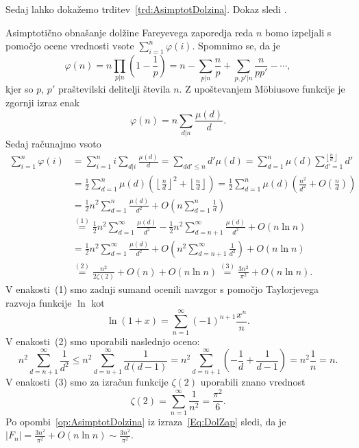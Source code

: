 \documentclass[mat1]{fmfdelo}
\begin{document}
%
Sedaj lahko dokažemo trditev~\ref{trd:AsimptotDolzina}. Dokaz sledi \cite[poglavje 18.5, str.~268]{hardy}.

\begin{dokaz}
Asimptotično obnašanje dolžine Fareyevega zaporedja reda $n$ bomo izpeljali s pomočjo ocene vrednosti vsote \( \sum_{i=1}^n \varphi(i) \).
Spomnimo se, da je 
\[ \varphi(n) = n \prod_{p|n} \left (1 - \frac{1}{p} \right ) = n - \sum_{p|n} \frac{n}{p} + \sum_{p,p'|n} \frac{n}{pp'} - \cdots , \]
kjer so $p$, $p'$ praštevilski delitelji števila $n$.  Z upoštevanjem M\"obiusove funkcije je zgornji izraz enak
\[ \varphi(n) = n \sum_{d|n} \frac{\mu(d)}{d} .\]
Sedaj računajmo vsoto 
%
\begin{align}
\label{Eq:DolZap}
\sum_{i=1}^n \varphi(i)
  &= \sum_{i=1}^n i \sum_{d|i} \frac{\mu(d)}{d} = \sum_{dd'\leq n}d' \mu(d) = 
    \sum_{d=1}^n \mu(d) \sum_{d'=1}^{\left \lfloor \frac{n}{d} \right \rfloor} d' \nonumber \\
  &= \frac{1}{2} \sum_{d=1}^{n} \mu(d) \left (\left \lfloor \frac{n}{d} \right \rfloor ^2 + \left \lfloor \frac{n}{d} \right \rfloor \right) =
    \frac{1}{2} \sum_{d=1}^{n} \mu(d) \left (\frac{n^2}{d^2} + O \left (\frac{n}{d} \right) \right) \nonumber \\
  &= \frac{1}{2}n^2 \sum_{d=1}^{n} \frac{\mu(d)}{d^2} + O \left (n \sum_{d=1}^{n} \frac{1}{d} \right ) \nonumber \\
  &\stackrel{(1)}{=} \frac{1}{2}n^2 \sum_{d=1}^{\infty} \frac{\mu(d)}{d^2} - \frac{1}{2}n^2 \sum_{d=n+1}^{\infty} \frac{\mu(d)}{d^2} + O(n \ln{n}) \nonumber \\
  &= \frac{1}{2}n^2 \sum_{d=1}^{\infty} \frac{\mu(d)}{d^2} + O \left (n^2\sum_{d=n+1}^{\infty} \frac{1}{d^2} \right ) + O(n \ln{n}) \nonumber \\
  & \stackrel{(2)}{=} \frac{n^2}{2 \zeta(2)} + O(n) + O(n \ln{n}) \stackrel{(3)}{=} \frac{3n^2}{\pi^2} + O(n \ln{n}).
\end{align}
%
V enakosti~(1) smo zadnji sumand ocenili navzgor s pomočjo Taylorjevega razvoja funkcije $\ln$ kot
\[ \ln{(1+x)} = \sum_{n=1}^{\infty} (-1)^{n+1} \frac{x^n}{n}.\]
%
V enakosti~(2) smo uporabili naslednjo oceno:
\[ n^2 \sum_{d=n+1}^{\infty} \frac{1}{d^2} \leq n^2 \sum_{d=n+1}^{\infty} \frac{1}{d(d-1)} = 
n^2 \sum_{d=n+1}^{\infty} \left (- \frac{1}{d} + \frac{1}{d-1} \right ) = n^2 \frac{1}{n} = n.\]
%
V enakosti~(3) smo za izračun funkcije $\zeta(2)$ uporabili znano vrednost
\[ \zeta(2) = \sum_{n=1}^{\infty} \frac{1}{n^2} = \frac{\pi^2}{6}.\]
%
Po opombi~\ref{op:AsimptotDolzina} iz izraza~\eqref{Eq:DolZap} sledi, da je \(|F_n| = \frac{3n^2}{\pi^2} + O(n \ln{n}) \sim\frac{3n^2}{\pi^2}. \)
\end{dokaz}
\end{document}
